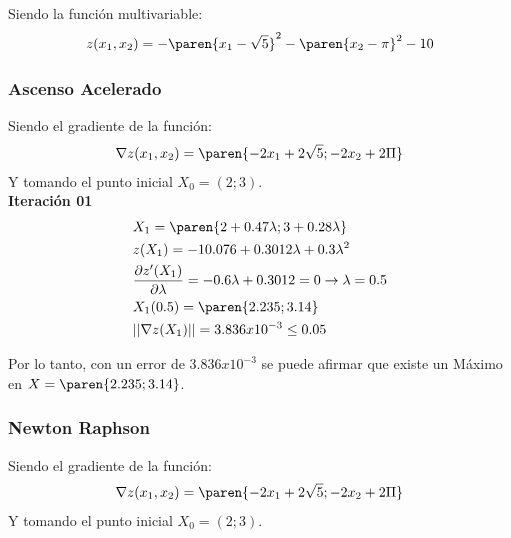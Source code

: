 \begin{homeworkProblem}
Siendo la función multivariable:
\begin{align*}
    z(x_1,x_2)=-\paren{x_1-\sqrt{5}}^2 -\paren{x_2-\pi}^2 - 10
\end{align*}

\subsubsection{Ascenso Acelerado}   

Siendo el gradiente de la función:
\begin{align*}
    \nabla z(x_1,x_2)=\paren{-2x_1+2\sqrt{5};-2x_2+2\Pi}
\end{align*}
Y tomando el punto inicial $X_0=(2;3)$.\\

\textbf{Iteración 01}\\
\begin{align*}
    &X_1=\paren{2+0.47\lambda ; 3+0.28\lambda}\\
    &z(X_1)=-10.076 + 0.3012\lambda + 0.3\lambda^2\\
    &\frac{\partial z'(X_1) }{\partial \lambda}=-0.6\lambda + 0.3012 = 0 \rightarrow \lambda = 0.5\\
    &X_1(0.5)=\paren{ 2.235 ; 3.14 }\\
    &||\nabla z(X_1)|| = 3.836x10^{-3} \leq 0.05
\end{align*}

Por lo tanto, con un error de $3.836x10^{-3}$ se puede afirmar que existe un Máximo en $X=\paren{2.235;3.14}$.


\subsubsection{Newton Raphson}   

Siendo el gradiente de la función:
\begin{align*}
    \nabla z(x_1,x_2)=\paren{-2x_1+2\sqrt{5};-2x_2+2\Pi}
\end{align*}
Y tomando el punto inicial $X_0=(2;3)$.\\


\end{homeworkProblem}
